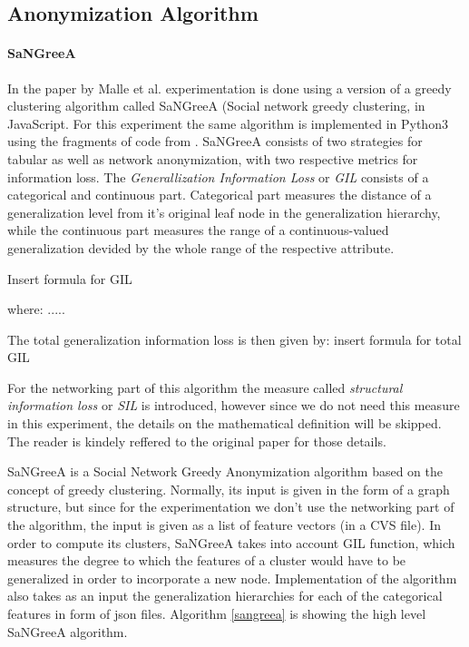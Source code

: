 \documentclass{article}
\begin{document}
\subsection{Anonymization Algorithm}
\paragraph{SaNGreeA}
In the paper by Malle et al. \cite{malle2017not} experimentation is done using a version of a greedy clustering algorithm called SaNGreeA (Social network greedy clustering, \cite{campan2009data} in JavaScript. For this experiment the same algorithm is implemented in Python3 \cite{sarcevic2018sangreea} using the fragments of code from \cite{malle2016sangreea}. 
SaNGreeA consists of two strategies for tabular as well as network anonymization, with two respective metrics for information loss. The \textit{Generallization Information Loss} or \textit{GIL} consists of a categorical and continuous part. Categorical part measures the distance of a generalization level from it's original leaf node in the generalization hierarchy, while the continuous part measures the range of a continuous-valued generalization devided by the whole range of the respective attribute. 

Insert formula for GIL

where:
.....

The total generalization information loss is then given by:
insert formula for total GIL

For the networking part of this algorithm the measure called \textit{structural information loss} or \textit{SIL} is introduced, however since we do not need this measure in this experiment, the details on the mathematical definition will be skipped. The reader is kindely reffered to the original paper \cite{campan2009data} for those details.

SaNGreeA is a Social Network Greedy Anonymization algorithm based on the concept of greedy clustering. Normally, its input is given in the form of a graph structure, but since for the experimentation we don't use the networking part of the algorithm, the input is given as a list of feature vectors (in a CVS file). In order to compute its clusters, SaNGreeA takes into account GIL function, which measures the degree to which the features of a cluster would have to be generalized in order to incorporate a new node. Implementation of the algorithm also takes as an input the generalization hierarchies for each of the categorical features in form of json files. Algorithm \vref{sangreea} is showing the high level SaNGreeA algorithm.
\end{document}
